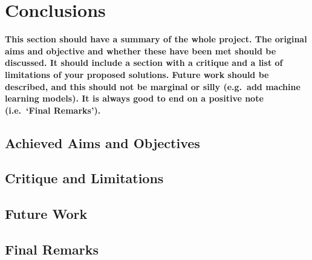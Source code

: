 \chapter{Conclusions}
\textbf{This section should have a summary of the whole project.  The original aims and objective and whether these have been met should be discussed. It should include a section with a critique and a list of limitations of your proposed solutions.  Future work should be described, and this should not be marginal or silly (e.g.\ add machine learning models).  It is always good to end on a positive note (i.e.\ `Final Remarks').}

\section{Achieved Aims and Objectives}
\blindtext

\section{Critique and Limitations}
\blindtext

\section{Future Work}
\blindtext

\section{Final Remarks}
\blindtext
